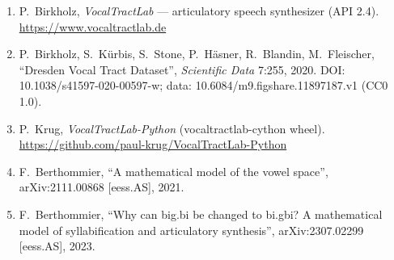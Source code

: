\documentclass[11pt,a4paper]{article}
\begin{document}
\begin{enumerate}[leftmargin=1.8em,itemsep=3pt]
\sloppy
\item P.~Birkholz, \emph{VocalTractLab} --- articulatory speech
      synthesizer (API 2.4). \url{https://www.vocaltractlab.de}
\item P.~Birkholz, S.~K\"urbis, S.~Stone, P.~H\"asner, R.~Blandin,
      M.~Fleischer, ``Dresden Vocal Tract Dataset'',
      \emph{Scientific Data} 7:255, 2020.
      DOI: 10.1038/s41597-020-00597-w; data:
      10.6084/m9.figshare.11897187.v1 (CC0 1.0).
\item P.~Krug, \emph{VocalTractLab-Python} (vocaltractlab-cython
      wheel). \url{https://github.com/paul-krug/VocalTractLab-Python}
\item F.~Berthommier, ``A mathematical model of the vowel space'',
      arXiv:2111.00868 [eess.AS], 2021.
\item F.~Berthommier, ``Why can big.bi be changed to bi.gbi? A
      mathematical model of syllabification and articulatory
      synthesis'', arXiv:2307.02299 [eess.AS], 2023.
\end{enumerate}
\end{document}
